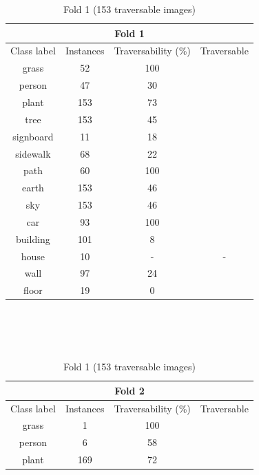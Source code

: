 \documentclass[12pt,a4paper,table,dvipsnames,tikz]{report}
\begin{document}
	\begin{table}[h!]
		\begin{subtable}[h!]{\textwidth}
			\centering
			\begin{tabular}{|c|c|c|c|}
				\hline
				\multicolumn{4}{|c|}{Fold 1}\\
				\hline
				Class label & Instances & Traversability (\%) & Traversable\\
				\hline\hline
				grass & 52 & 100 & \checkmark\\
				\hline
				person & 47 & 30 &\\
				\hline
				\rowcolor{plant}
				plant & 153 & 73 & \checkmark\\
				\hline
				\rowcolor{tree}
				tree & 153 & 45 &\\
				\hline
				signboard & 11 & 18 &\\
				\hline
				sidewalk & 68 & 22 &\\
				\hline
				path & 60 & 100 & \checkmark\\
				\hline
				\rowcolor{earth}
				earth & 153 & 46 &\\
				\hline
				\rowcolor{sky}
				sky & 153 & 46 &\\
				\hline
				car & 93 & 100 & \checkmark\\
				\hline
				building & 101 & 8 &\\
				\hline
				\rowcolor{house}
				house & 10 & - & -\\
				\hline
				\rowcolor{wall}
				wall & 97 & 24 &\\
				\hline
				floor & 19 & 0 &\\
				\hline
			\end{tabular}
			\caption{Fold 1 (153 traversable images)}
			\label{table:trav.f1}
		\end{subtable}
		\\\\\\
		\begin{subtable}[h!]{\textwidth}
			\centering
			\begin{tabular}{|c|c|c|c|}
				\hline
				\multicolumn{4}{|c|}{Fold 2}\\
				\hline
				Class label & Instances & Traversability (\%) & Traversable\\
				\hline\hline
				grass & 1 & 100 & \checkmark\\
				\hline
				person & 6 & 58 & \checkmark\\
				\hline
				plant & 169 & 72 & \checkmark\\

\end{tabular}
\end{subtable}
\end{table}
\end{document}
